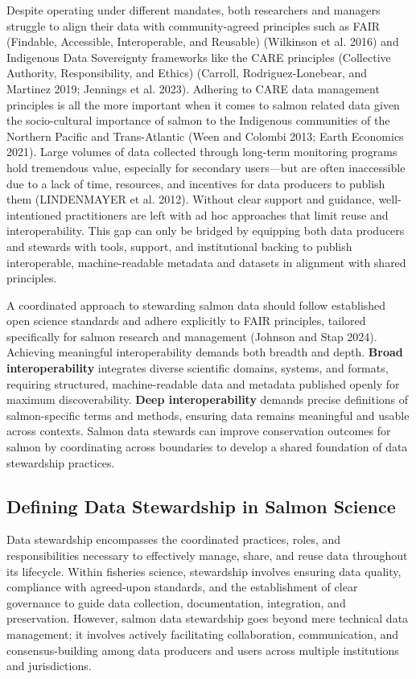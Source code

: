 \documentclass[
  letterpaper,
  DIV=11,
  numbers=noendperiod]{scrartcl}
\begin{document}
Despite operating under different mandates, both researchers and
managers struggle to align their data with community-agreed principles
such as FAIR (Findable, Accessible, Interoperable, and Reusable)
(Wilkinson et al. 2016) and Indigenous Data Sovereignty frameworks like
the CARE principles (Collective Authority, Responsibility, and Ethics)
(Carroll, Rodriguez-Lonebear, and Martinez 2019; Jennings et al. 2023).
Adhering to CARE data management principles is all the more important
when it comes to salmon related data given the socio-cultural importance
of salmon to the Indigenous communities of the Northern Pacific and
Trans-Atlantic (Ween and Colombi 2013; Earth Economics 2021). Large
volumes of data collected through long-term monitoring programs hold
tremendous value, especially for secondary users---but are often
inaccessible due to a lack of time, resources, and incentives for data
producers to publish them (LINDENMAYER et al. 2012). Without clear
support and guidance, well-intentioned practitioners are left with ad
hoc approaches that limit reuse and interoperability. This gap can only
be bridged by equipping both data producers and stewards with tools,
support, and institutional backing to publish interoperable,
machine-readable metadata and datasets in alignment with shared
principles.

A coordinated approach to stewarding salmon data should follow
established open science standards and adhere explicitly to FAIR
principles, tailored specifically for salmon research and management
(Johnson and Stap 2024). Achieving meaningful interoperability demands
both breadth and depth. \textbf{Broad interoperability} integrates
diverse scientific domains, systems, and formats, requiring structured,
machine-readable data and metadata published openly for maximum
discoverability. \textbf{Deep interoperability} demands precise
definitions of salmon-specific terms and methods, ensuring data remains
meaningful and usable across contexts. Salmon data stewards can improve
conservation outcomes for salmon by coordinating across boundaries to
develop a shared foundation of data stewardship practices.

\subsection{Defining Data Stewardship in Salmon
Science}\label{defining-data-stewardship-in-salmon-science}

Data stewardship encompasses the coordinated practices, roles, and
responsibilities necessary to effectively manage, share, and reuse data
throughout its lifecycle. Within fisheries science, stewardship involves
ensuring data quality, compliance with agreed-upon standards, and the
establishment of clear governance to guide data collection,
documentation, integration, and preservation. However, salmon data
stewardship goes beyond mere technical data management; it involves
actively facilitating collaboration, communication, and
consensus-building among data producers and users across multiple
institutions and jurisdictions.
\end{document}
